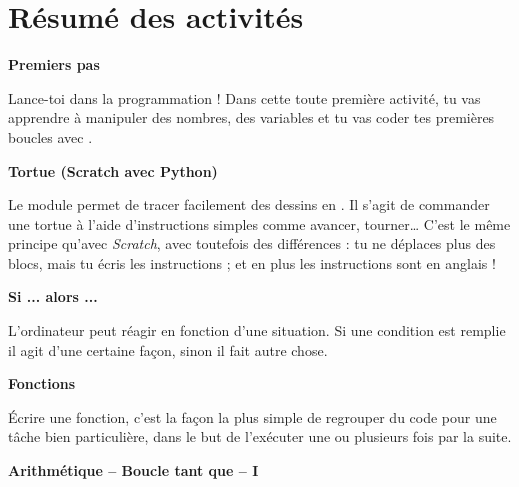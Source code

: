 \vspace*{\fill}



\cleardoublepage
\thispagestyle{empty}
\tableofcontents


\newpage

\section*{Résumé des activités}


\newcommand{\titreactivite}[1]{{\large\textbf{#1}}\nopagebreak}
\newcommand{\descriptionactivite}[1]{%
\smallskip\hfill
\begin{minipage}{0.95\textwidth}#1\end{minipage}\medskip\smallskip}

\titreactivite{Premiers pas}

\descriptionactivite{Lance-toi dans la programmation ! Dans cette toute première activité, tu vas apprendre à manipuler des nombres, des variables et tu vas coder tes premières boucles avec \Python.}

\titreactivite{Tortue (Scratch avec Python)}

\descriptionactivite{Le module 
 permet de tracer facilement des dessins en \Python{}. Il s'agit de commander une tortue à l'aide d'instructions simples comme \og{}avancer\fg{}, \og{}tourner\fg{}\ldots{} C'est le même principe qu'avec \emph{Scratch}, avec toutefois des différences : tu ne déplaces plus des blocs, mais tu écris les instructions ; et en plus les instructions sont en anglais !}

\titreactivite{Si ... alors ...}

\descriptionactivite{L'ordinateur peut réagir en fonction d'une situation. 
Si une condition est remplie il agit d'une certaine façon, 
sinon il fait autre chose.}

\titreactivite{Fonctions}

\descriptionactivite{\'Ecrire une fonction, c'est la façon la plus simple de regrouper du code pour une tâche bien particulière, dans le but de l'exécuter une ou plusieurs fois par la suite.}

\titreactivite{Arithmétique -- Boucle tant que -- I}

